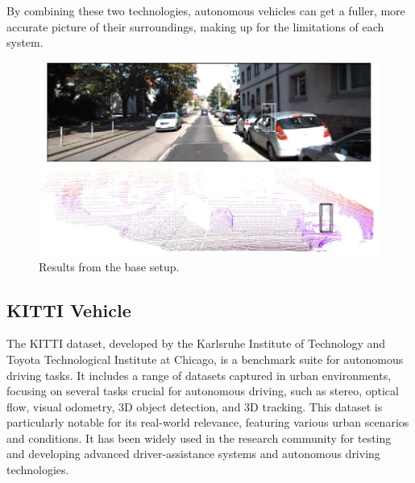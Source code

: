 \documentclass[letterpaper, 10 pt, conference]{ieeeconf}  %
\begin{document}
By combining these two technologies, autonomous vehicles can get a fuller, more accurate picture of their surroundings, making up for the limitations of each system.

\begin{figure}[htbp]
  \centering
  \includegraphics[width=\linewidth]{whylidarcamera.png}
  \caption{Results from the base setup.}
  \label{Why Lidar and Camera}
\end{figure}

\subsection{KITTI Vehicle}
The KITTI dataset, developed by the Karlsruhe Institute of Technology and Toyota Technological Institute at Chicago, is a benchmark suite for autonomous driving tasks. It includes a range of datasets captured in urban environments, focusing on several tasks crucial for autonomous driving, such as stereo, optical flow, visual odometry, 3D object detection, and 3D tracking. This dataset is particularly notable for its real-world relevance, featuring various urban scenarios and conditions. It has been widely used in the research community for testing and developing advanced driver-assistance systems and autonomous driving technologies. \cite{KITTI}
\end{document}

